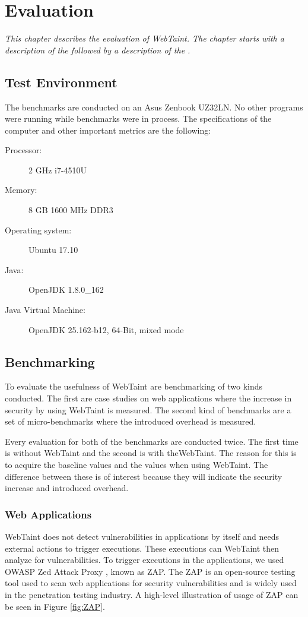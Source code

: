 \chapter{Evaluation}
\label{Evaluation}
\textit{This chapter describes the evaluation of WebTaint. The chapter starts with a description of the \textit{} followed by a description of the \textit{}.}



\section{Test Environment}
\label{TestEnvironment}
The benchmarks are conducted on an Asus Zenbook UZ32LN. No other programs were running while benchmarks were in process. The specifications of the computer and other important metrics are the following:

\begin{description}
    \item [Processor:] 2 GHz i7-4510U
    \item [Memory:] 8 GB 1600 MHz DDR3
    \item [Operating system:] Ubuntu 17.10
    \item [Java:] OpenJDK 1.8.0\_162
    \item [Java Virtual Machine:] OpenJDK 25.162-b12, 64-Bit, mixed mode
\end{description}



\section{Benchmarking}
\label{Benchmarking}
To evaluate the usefulness of WebTaint are benchmarking of two kinds conducted. The first are case studies on web applications where the increase in security by using WebTaint is measured. The second kind of benchmarks are a set of micro-benchmarks where the introduced overhead is measured.

Every evaluation for both of the benchmarks are conducted twice. The first time is without WebTaint and the second is with theWebTaint. The reason for this is to acquire the baseline values and the values when using WebTaint. The difference between these is of interest because they will indicate the security increase and introduced overhead.



\subsection{Web Applications}
WebTaint does not detect vulnerabilities in applications by itself and needs external actions to trigger executions. These executions can WebTaint then analyze for vulnerabilities. To trigger executions in the applications, we used OWASP Zed Attack Proxy \parencite{zap}, known as ZAP. The ZAP is an open-source testing tool used to scan web applications for security vulnerabilities and is widely used in the penetration testing industry. A high-level illustration of usage of ZAP can be seen in Figure \ref{fig:ZAP}. 


